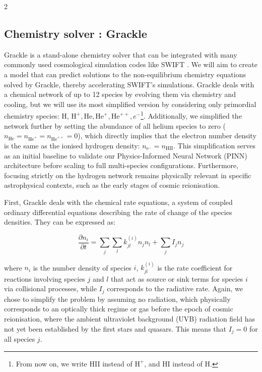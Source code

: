 \documentclass[10pt,a4paper]{article}
\begin{document}
\begin{multicols}{2}
\subsection{Chemistry solver : Grackle}

Grackle \cite{smith2017grackle} is a stand-alone chemistry solver that can be integrated with many commonly used cosmological simulation codes like SWIFT \cite{schaller2024swift}. We will aim to create a model that can predict solutions to the non-equilibrium chemistry equations solved by Grackle, thereby accelerating SWIFT's simulations. Grackle deals with a chemical network of up to 12 species by evolving them via chemistry and cooling, but we will use its most simplified version by considering only primordial chemistry species: H, $\mathrm{H}^{+}, \mathrm{He}, \mathrm{He}^{+}, \mathrm{He}^{++}, e^{-}$\footnote{From now on, we write HII instead of $\mathrm{H}^{+}$, and HI instead of H.}. Additionally, we simplified the network further by setting the abundance of all helium species to zero ($n_{\mathrm{He}} = n_{\mathrm{He}^{+}} = n_{\mathrm{He}^{++}} = 0$), which directly implies that the electron number density is the same as the ionised hydrogen density: $n_{\mathrm{e}^{-}} = n_{\mathrm{HII}}$. This simplification serves as an initial baseline to validate our Physics-Informed Neural Network (PINN) architecture before scaling to full multi-species configurations. Furthermore, focusing strictly on the hydrogen network remains physically relevant in specific astrophysical contexts, such as the early stages of cosmic reionisation.

First, Grackle deals with the chemical rate equations, a system of coupled ordinary differential equations describing the rate of change of the species densities. They can be expressed as:

\begin{equation}
\frac{\partial n_{i}}{\partial t}=\sum_{j} \sum_{l} k_{jl}^{(i)} n_{j} n_{l}+\sum_{j} I_{j} n_{j}
\end{equation}

where $n_{i}$ is the number density of species $i$, $k_{jl}^{(i)}$ is the rate coefficient for reactions involving species $j$ and $l$ that act as source or sink terms for species $i$ via collisional processes, while $I_{j}$ corresponds to the radiative rate. Again, we chose to simplify the problem by assuming no radiation, which physically corresponds to an optically thick regime or gas before the epoch of cosmic reionisation, where the ambient ultraviolet background (UVB) radiation field has not yet been established by the first stars and quasars. This means that $I_{j}=0$ for all species $j$.


\end{multicols}
\end{document}
